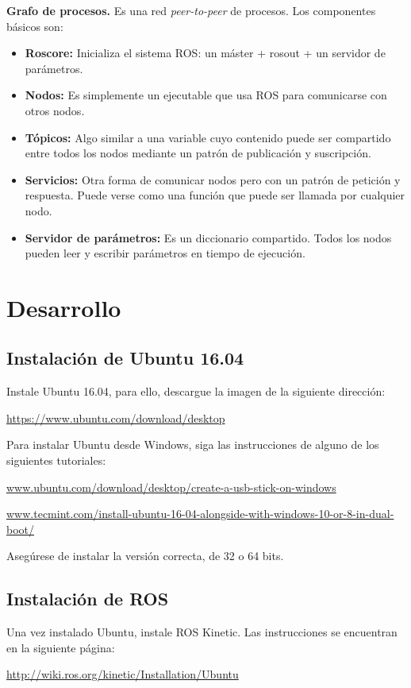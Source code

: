 \documentclass[letterpaper,12pt]{article}
\begin{document}
\textbf{Grafo de procesos.} Es una red \textit{peer-to-peer} de procesos. Los componentes básicos son:
\begin{itemize}
\item \textbf{Roscore:} Inicializa el sistema ROS: un máster + rosout + un servidor de parámetros.
\item \textbf{Nodos:} Es simplemente un ejecutable que usa ROS para comunicarse con otros nodos.
\item \textbf{Tópicos:} Algo similar a una variable cuyo contenido puede ser compartido entre todos los nodos mediante un patrón de publicación y suscripción. 
\item \textbf{Servicios:} Otra forma de comunicar nodos pero con un patrón de petición y respuesta. Puede verse como una función que puede ser llamada por cualquier nodo.
\item \textbf{Servidor de parámetros:} Es un diccionario compartido. Todos los nodos pueden leer y escribir parámetros en tiempo de ejecución.
\end{itemize}

\section{Desarrollo}
\subsection{Instalación de Ubuntu 16.04}
Instale Ubuntu 16.04, para ello, descargue la imagen de la siguiente dirección:

\url{https://www.ubuntu.com/download/desktop}

Para instalar Ubuntu desde Windows, siga las instrucciones de alguno de los siguientes tutoriales:

\url{www.ubuntu.com/download/desktop/create-a-usb-stick-on-windows}

\url{www.tecmint.com/install-ubuntu-16-04-alongside-with-windows-10-or-8-in-dual-boot/}

Asegúrese de instalar la versión correcta, de 32 o 64 bits. 

\subsection{Instalación de ROS}

Una vez instalado Ubuntu, instale ROS Kinetic. Las instrucciones se encuentran en la siguiente página:

\url{http://wiki.ros.org/kinetic/Installation/Ubuntu}
\end{document}
